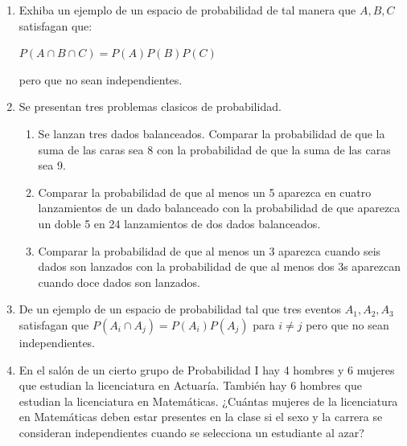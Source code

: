 \documentclass[12pt,a4paper]{report}
\begin{document}
\begin{enumerate}
   \item {
  Exhiba un ejemplo de un espacio de probabilidad de tal manera que $A,B,C$ satisfagan que: \\
  \begin{center}
  $P(A\cap B \cap C) = P(A)P(B)P(C)$
  \end{center}
  pero que no sean independientes.
	}

   \item {
    Se presentan tres problemas clasicos de probabilidad.

    \begin{enumerate}[label=\alph*) ]
    \item{Se lanzan tres dados balanceados. Comparar la probabilidad de que la suma de las caras sea 8 con la probabilidad de que la suma de las caras sea 9.
    }\\

    \item{Comparar la probabilidad de que al menos un 5 aparezca en cuatro lanzamientos de un dado balanceado con la probabilidad de que aparezca un doble 5 en 24 lanzamientos de dos dados balanceados.} \\
    \item{Comparar la probabilidad de que al menos un 3 aparezca cuando seis dados son lanzados con la probabilidad de que al menos dos 3s aparezcan cuando doce dados son lanzados.}
    \end{enumerate}
	}


   \item {
   De un ejemplo de un espacio de probabilidad tal que tres eventos $A_{1},A_{2},A_{3}$ satisfagan que $P(A_{i}\cap A_{j})=P(A_{i})P(A_{j})$ para $i\neq j$ pero que no sean independientes.\\
	}

   \item {En el salón de un cierto grupo de Probabilidad I hay 4 hombres y 6 mujeres que estudian la licenciatura en Actuaría. También hay 6 hombres que estudian la licenciatura en Matemáticas. ¿Cuántas mujeres de la licenciatura en Matemáticas deben estar presentes en la clase si el sexo y la carrera se consideran independientes cuando se selecciona un estudiante al azar?
	}


\end{enumerate}
\end{document}
